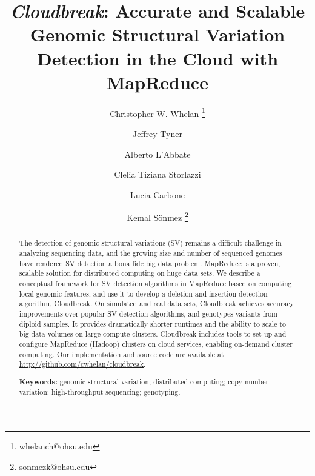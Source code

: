 \documentclass[11pt]{article}
\begin{document}
\title{{\em Cloudbreak}: Accurate and Scalable Genomic Structural Variation Detection in the Cloud with MapReduce}

\author[1,5]{Christopher W. Whelan \thanks{whelanch@ohsu.edu}}
\author[3,4]{Jeffrey Tyner}
\author[6]{Alberto L'Abbate}
\author[6]{Clelia Tiziana Storlazzi}
\author[4,5]{Lucia Carbone}
\author[1,2,5]{Kemal S\"onmez \thanks{sonmezk@ohsu.edu}}

\maketitle


 \begin{abstract}

The detection of genomic structural variations (SV) remains a difficult challenge in analyzing sequencing data, and the growing size and number of sequenced genomes have rendered SV detection a bona fide big data problem. MapReduce is a proven, scalable solution for distributed computing on huge data sets. We describe a conceptual framework for SV detection algorithms in MapReduce based on computing local genomic features, and use it to develop a deletion and insertion detection algorithm, Cloudbreak. On simulated and real data sets, Cloudbreak achieves accuracy improvements over popular SV detection algorithms, and genotypes variants from diploid samples. It provides dramatically shorter runtimes and the ability to scale to big data volumes on large compute clusters. Cloudbreak includes tools to set up and configure MapReduce (Hadoop) clusters on cloud services, enabling on-demand cluster computing. Our implementation and source code are available at \url{http://github.com/cwhelan/cloudbreak}. 

 \medskip
 \noindent\textbf{Keywords:} genomic structural variation; distributed computing; copy number variation; high-throughput sequencing; genotyping.
 \end{abstract}

\newpage
\end{document}
